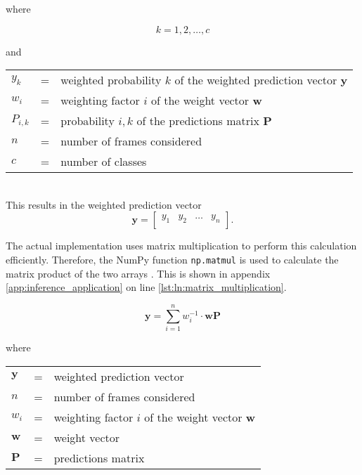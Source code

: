 where

\[
  k = 1, 2, \dots, c
\]

and

\begin{tabular}{lll}
  $y_k$ & = & weighted probability $k$ of the weighted prediction vector $\boldsymbol{y}$ \\
  $w_i$ & = & weighting factor $i$ of the weight vector $\boldsymbol{w}$ \\
  $P_{i,k}$ & = & probability $i,k$ of the predictions matrix $\boldsymbol{P}$ \\
  $n$ & = & number of frames considered \\
  $c$ & = & number of classes \\
\end{tabular}
\\

This results in the weighted prediction vector
\begin{equation}
  \boldsymbol{y} =
  \begin{bmatrix}
    y_{1} & y_{2} & \dots & y_{n} \\
  \end{bmatrix}.
  \label{eq:weighted_prediction_vector}
\end{equation}

The actual implementation uses matrix multiplication to perform this calculation efficiently.
Therefore, the NumPy function \texttt{np.matmul} is used to calculate the matrix product of the two arrays \cite{inf_numpy_matmul}.
This is shown in appendix \ref{app:inference_application} on line \ref{lst:ln:matrix_multiplication}.

\begin{equation}
  \boldsymbol{y} = \sum\limits_{i=1}^{n} w_i^{-1} \cdot \boldsymbol{w} \boldsymbol{P}
  \label{eq:weighted_prediction}
\end{equation}

where

\begin{tabular}{lll}
  $\boldsymbol{y}$ & = & weighted prediction vector \\
  $n$ & = & number of frames considered \\
  $w_i$ & = & weighting factor $i$ of the weight vector $\boldsymbol{w}$ \\
  $\boldsymbol{w}$ & = & weight vector \\
  $\boldsymbol{P}$ & = & predictions matrix \\
\end{tabular}
\\

